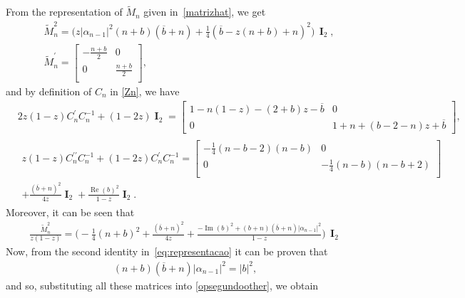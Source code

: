 \documentclass[12pt]{amsart}
\begin{document}
From the representation of \(\widetilde M_n \) given in~\eqref{matrizhat}, we get
\begin{align*}
&\widetilde M_n^2 = \big( z | \alpha_{n-1}|^2 (n+b) (\overline b + n )+\frac{1}{4} ( \overline b - z (n+b)+n )^2 \big) \, \mathbf{\operatorname I}_2, \\
&\widetilde M_n^\prime =
\begin{bmatrix}
 -\frac{n+b}{2} & 0 \\
 0 & \frac{n+b}{2} \\
\end{bmatrix},
\end{align*}
and by definition of \( C_n \) in \eqref{Zn}, we have
\begin{align*}
 & 2z(1-z)C_n^{\prime}C_n^{-1}+(1-2z)\mathbf{\operatorname I}_2=
\begin{bmatrix}
1-n(1-z)-(2+b)z-\overline{b} & 0\\
0 & 1+n+(b-2-n)z+\overline{b}
\end{bmatrix} ,
 \\
 & \begin{multlined}
z(1-z)C_n^{\prime\prime}C_n^{-1}+(1-2z)C_n^{\prime}C_n^{-1}
 = \begin{bmatrix}
 -\frac{1}{4} (n-b-2) (n-b) & 0 \\
 0 & -\frac{1}{4} (n-b) (n-b+2) \\
\end{bmatrix} \\
+ \frac{(\overline{b}+n)^2}{4z} \mathbf{\operatorname I}_2
+ \frac{\operatorname{Re} (b)^2}{1-z} \mathbf{\operatorname I}_2 .
\end{multlined}
\end{align*}
Moreover,
it can be seen
that 
\begin{align*}
\frac{\widetilde M_n^2}{z(1-z)} 
 =
\Big( -\frac{1}{4} (n+b)^2 +\frac{(\overline{b}+n)^2}{4z} +\frac{ - 
\operatorname{Im}(b)^2 + (b+n)(\overline{b}+n) | \alpha_{n-1}| ^2}{1-z} \Big) \, \mathbf{\operatorname I}_2
\end{align*} 
Now, from the second identity in~\eqref{eq:representacao} it can be proven that
\begin{align*}
 (n+ b ) (\overline b +n ) |\alpha_{n-1}|^2 = | b| ^2 ,
\end{align*}
and so, substituting all these matrices into \eqref{opsegundoother}, we obtain
\end{document}
